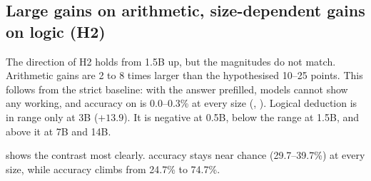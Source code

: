 \subsection{Large gains on arithmetic, size-dependent gains on logic (H2)}
\label{sec:h2}

The direction of H2 holds from 1.5B up, but the magnitudes do not match.
Arithmetic gains are 2 to 8 times larger than the hypothesised 10--25 points.
This follows from the strict baseline: with the answer prefilled, models cannot show any working, and \direct accuracy on \synth is 0.0--0.3\% at every size (, ).
Logical deduction is in range only at 3B ($+13.9$).
It is negative at 0.5B, below the range at 1.5B, and above it at 7B and 14B.

\proofwriter shows the contrast most clearly.
\direct accuracy stays near chance (29.7--39.7\%) at every size, while \CoT accuracy climbs from 24.7\% to 74.7\%.

